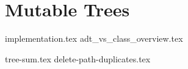 \documentclass{exam}
\begin{document}
\newpage
\section{Mutable Trees}
{implementation.tex}
{adt_vs_class_overview.tex}
\vspace{\baselineskip}
\begin{questions}
{tree-sum.tex}
\newpage
{delete-path-duplicates.tex}
\end{questions}
\end{document}
